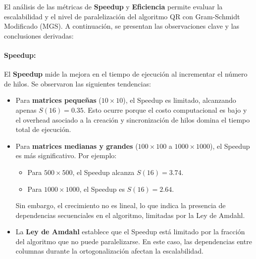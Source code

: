 \documentclass{article}
\begin{document}
El análisis de las métricas de \textbf{Speedup} y \textbf{Eficiencia} permite evaluar la escalabilidad y el nivel de paralelización del algoritmo QR con Gram-Schmidt Modificado (MGS). A continuación, se presentan las observaciones clave y las conclusiones derivadas:

\paragraph{Speedup:} 
El \textbf{Speedup} mide la mejora en el tiempo de ejecución al incrementar el número de hilos. Se observaron las siguientes tendencias:
\begin{itemize}
    \item Para \textbf{matrices pequeñas} (\(10 \times 10\)), el Speedup es limitado, alcanzando apenas \(S(16) = 0.35\). Esto ocurre porque el costo computacional es bajo y el overhead asociado a la creación y sincronización de hilos domina el tiempo total de ejecución.
    \item Para \textbf{matrices medianas y grandes} (\(100 \times 100\) a \(1000 \times 1000\)), el Speedup es más significativo. Por ejemplo:
    \begin{itemize}
        \item Para \(500 \times 500\), el Speedup alcanza \(S(16) = 3.74\).
        \item Para \(1000 \times 1000\), el Speedup es \(S(16) = 2.64\).
    \end{itemize}
    Sin embargo, el crecimiento no es lineal, lo que indica la presencia de dependencias secuenciales en el algoritmo, limitadas por la Ley de Amdahl.
    \item La \textbf{Ley de Amdahl} establece que el Speedup está limitado por la fracción del algoritmo que no puede paralelizarse. En este caso, las dependencias entre columnas durante la ortogonalización afectan la escalabilidad.
\end{itemize}
\end{document}
